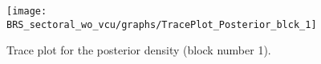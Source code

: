 \begin{figure}[H]
\centering
  \texttt{[image: BRS\_sectoral\_wo\_vcu/graphs/TracePlot\_Posterior\_blck\_1]}\\
    \caption{Trace plot for the posterior density (block number 1).}
\end{figure}
